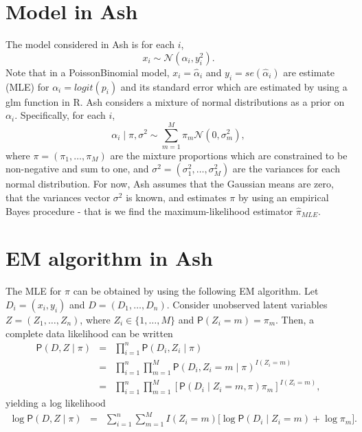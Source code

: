 \documentclass[12pt,letterpaper]{article}
\renewcommand{\Pr}{\mathsf{P}}
\newcommand{\given}{\mid}
\newcommand{\Normal}{\mathcal{N}}
\begin{document}


\section{Model in Ash}
\label{sec:Model_Ash}
The model considered in Ash is for each $i$,
\begin{equation}
x_i \sim \Normal(\alpha_i, y_i^2).
\end{equation}
Note that in a PoissonBinomial model, $x_i = \hat{\alpha}_i$ and $y_i = se(\hat{\alpha}_i)$ are estimate (MLE) for $\alpha_i = logit(p_i)$ and its standard error which are estimated by using a glm function in R. 
Ash considers a mixture of normal distributions as a prior on $\alpha_i$. Specifically, for each $i$,
\begin{equation}
\alpha_i \given \pi, \sigma^2 \sim \sum_{m=1}^M \pi_m \Normal(0, \sigma^2_m),\label{eqn:ash_prior}
\end{equation}
where $\pi = (\pi_1, \ldots, \pi_M)$ are the mixture proportions which are constrained to be non-negative and sum to one, and $\sigma^2 = (\sigma^2_1, \ldots, \sigma^2_M)$ are the variances for each normal distribution. For now, Ash assumes that the Gaussian
 means are zero, that the variances vector $\sigma^2$ is known, and estimates $\pi$ by using an empirical Bayes procedure - that is
 we find the maximum-likelihood estimator $\hat{\pi}_{MLE}$.

\section{EM algorithm in Ash}
\label{sec:EM_Ash}
The MLE for $\pi$ can be obtained by using the following EM algorithm. Let $D_i = (x_i, y_i)$ and $D = (D_1, \ldots, D_n)$. Consider unobserved latent variables $Z = (Z_1, \ldots, Z_n)$, where $Z_i \in \{1, \ldots, M\}$ and $\Pr(Z_i = m) = \pi_m$. Then, a complete data likelihood can be written
\begin{eqnarray}
\Pr(D, Z \given \pi) &=& \prod_{i=1}^{n}\Pr(D_i, Z_i \given \pi)\\
&=& \prod_{i=1}^{n} \prod_{m=1}^M\Pr(D_i, Z_i = m \given \pi)^{I(Z_i = m)}\\
&=& \prod_{i=1}^{n} \prod_{m=1}^M[\Pr(D_i \given Z_i = m, \pi)\pi_m] ^{I(Z_i = m)},
\end{eqnarray}
yielding a log likelihood
\begin{eqnarray}
\log\Pr(D, Z \given \pi) &=& \sum_{i=1}^{n} \sum_{m=1}^M I(Z_i = m)\Big[\log{\Pr(D_i \given Z_i = m)} + \log{\pi_m}\Big].
\end{eqnarray}
\end{document}
